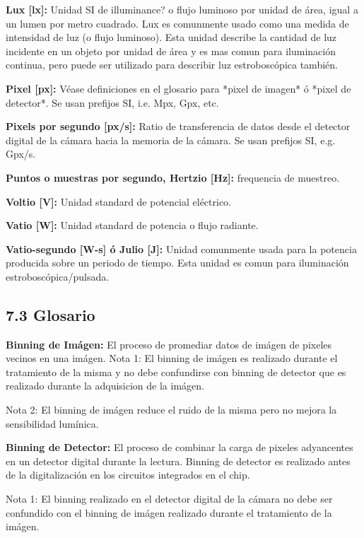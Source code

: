 \documentclass{article}
\begin{document}
\noindent\textbf{Lux [lx]:} Unidad SI de illuminance? o flujo luminoso por unidad de \'area, igual a un lumen por metro cuadrado. Lux es comunmente usado como una medida de intensidad de luz (o flujo luminoso). Esta unidad describe la cantidad de luz incidente en un objeto por unidad de \'area y es mas comun para iluminaci\'on continua, pero puede ser utilizado para describir luz estrobosc\'opica tambi\'en.

\noindent\textbf{Pixel [px]:} V\'ease definiciones en el glosario para *pixel de imagen* \'o *pixel de detector*. Se usan prefijos SI, i.e. Mpx, Gpx, etc.

\noindent\textbf{Pixels por segundo [px/s]:} Ratio de transferencia de datos desde el detector digital de la c\'amara hacia la memoria de la c\'amara. Se usan prefijos SI, e.g. Gpx/s.

\noindent\textbf{Puntos o muestras por segundo, Hertzio [Hz]:} frequencia de muestreo.

\noindent\textbf{Voltio [V]:} Unidad standard de potencial el\'ectrico.

\noindent\textbf{Vatio [W]:} Unidad standard de potencia o flujo radiante.

\noindent\textbf{Vatio-segundo [W-s] \'o Julio [J]:} Unidad comunmente usada para la potencia producida sobre un periodo de tiempo. Esta unidad es comun para iluminaci\'on estrobosc\'opica/pulsada.

\subsection*{7.3 Glosario}

\noindent\textbf{Binning de Im\'agen:} El proceso de promediar datos de im\'agen de pixeles vecinos en una im\'agen.
Nota 1: El binning de im\'agen es realizado durante el tratamiento de la misma y no debe confundirse con binning de detector que es realizado durante la adquisicion de la im\'agen.

Nota 2: El binning de im\'agen reduce el ruido de la misma pero no mejora la sensibilidad lum\'inica.


\noindent\textbf{Binning de Detector:} El proceso de combinar la carga de pixeles adyancentes en un detector digital durante la lectura. Binning de detector es realizado antes de la digitalizaci\'on en los circuitos integrados en el chip. 

Nota 1: El binning realizado en el detector digital de la c\'amara no debe ser confundido con el binning de im\'agen realizado durante el tratamiento de la im\'agen.
\end{document}
